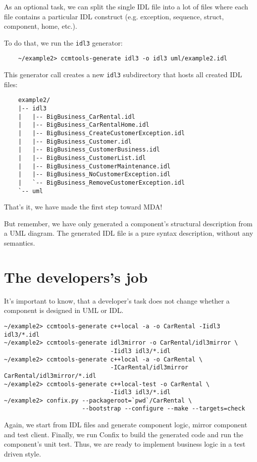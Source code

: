 As an optional task, we can split the single IDL file into a lot of files
where each file contains a particular IDL construct (e.g. exception, sequence,
struct, component, home, etc.). 

To do that, we run the {\tt idl3} generator:
\begin{small}
\begin{verbatim}
    ~/example2> ccmtools-generate idl3 -o idl3 uml/example2.idl
\end{verbatim}
\end{small}

This generator call creates a new {\tt idl3} subdirectory that hosts all
created IDL files: 
\begin{small}
\begin{verbatim}
    example2/
    |-- idl3
    |   |-- BigBusiness_CarRental.idl
    |   |-- BigBusiness_CarRentalHome.idl
    |   |-- BigBusiness_CreateCustomerException.idl
    |   |-- BigBusiness_Customer.idl
    |   |-- BigBusiness_CustomerBusiness.idl
    |   |-- BigBusiness_CustomerList.idl
    |   |-- BigBusiness_CustomerMaintenance.idl
    |   |-- BigBusiness_NoCustomerException.idl
    |   `-- BigBusiness_RemoveCustomerException.idl
    `-- uml
\end{verbatim}
\end{small}

That's it, we have made the first step toward MDA! 

But remember, we have only generated a component's structural description from
a UML diagram. The generated IDL file is a pure syntax description, without any semantics.  


\section{The developers's job}

It's important to know, that a developer's task does not change whether a component
is designed in UML or IDL.
\begin{small}
\begin{verbatim}
~/example2> ccmtools-generate c++local -a -o CarRental -Iidl3 idl3/*.idl  
~/example2> ccmtools-generate idl3mirror -o CarRental/idl3mirror \
                              -Iidl3 idl3/*.idl
~/example2> ccmtools-generate c++local -a -o CarRental \
                              -ICarRental/idl3mirror CarRental/idl3mirror/*.idl
~/example2> ccmtools-generate c++local-test -o CarRental \
                              -Iidl3 idl3/*.idl
~/example2> confix.py --packageroot=`pwd`/CarRental \
                      --bootstrap --configure --make --targets=check 
\end{verbatim}
\end{small}
Again, we start from IDL files and generate component logic, mirror component and test client.
Finally, we run Confix to build the generated code and run the component's unit test.
Thus, we are ready to implement business logic in a test driven style.